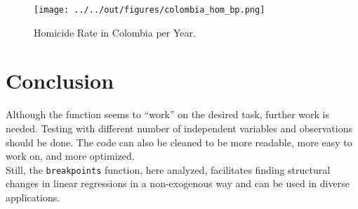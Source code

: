 \documentclass[11pt, a4paper, leqno]{article}
\begin{document}
\begin{figure}[ht]
    \centering
    \texttt{[image: ../../out/figures/colombia\_hom\_bp.png]}
    \caption{Homicide Rate in Colombia per Year.}
    \label{fig:4}

\end{figure}

\section{Conclusion}
\label{sec:conclusion}
Although the function seems to ``work'' on the desired task, further work is needed.  Testing with different number of independent variables and observations should be done. The code can also be cleaned to be more readable, more easy to work on, and more optimized.
\\
Still, the \texttt{breakpoints} function, here analyzed, facilitates finding structural changes in linear regressions in a non-exogenous way and can be used in diverse applications.

\newpage




\end{document}

